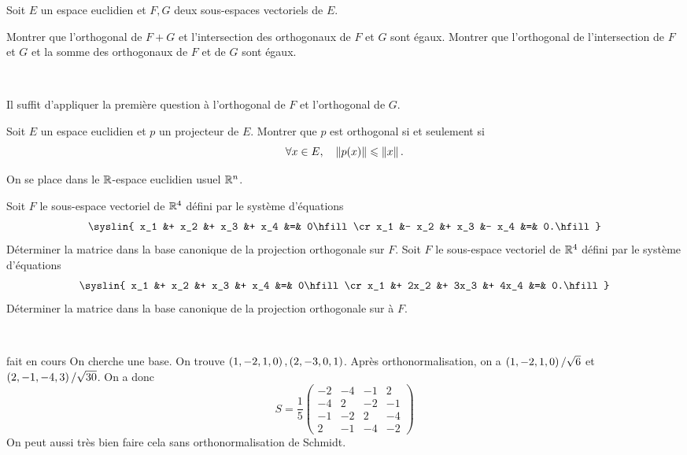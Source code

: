 \documentclass{magnolia}
\begin{document}

Soit $E$ un espace euclidien et $F,G$ deux sous-espaces vectoriels de $E$.
\begin{questions}
\question Montrer que l'orthogonal de $F+G$ et l'intersection des orthogonaux
  de $F$ et $G$ sont égaux.
\question Montrer que l'orthogonal de l'intersection de $F$ et $G$ et la somme des
  orthogonaux de $F$ et de $G$ sont égaux.
\end{questions}
\begin{sol}
$\quad$
\begin{questions}
\question
\question Il suffit d'appliquer la première question à l'orthogonal de $F$ et
  l'orthogonal de $G$.
\end{questions}
\end{sol}



Soit $E$ un espace euclidien et $p$ un projecteur de $E$. Montrer que $p$ est orthogonal si et seulement si
\[\forall x\in E ,\quad \left\|p(x)\right\|\leqslant\left\|x\right\|.\]


On se place dans le $\mathbb{R}$-espace euclidien usuel $\mathbb{R}^n$.
\begin{questions}
\question Soit $F$ le
  sous-espace vectoriel de $\mathbb{R}^4$ défini par le système d'équations
  $$\syslin{
  x_1 &+ x_2 &+ x_3 &+ x_4 &=& 0\hfill\cr
  x_1 &- x_2 &+ x_3 &- x_4 &=& 0.\hfill}
  $$
  Déterminer la matrice dans la base canonique de la projection
  orthogonale sur $F$.
\question Soit $F$ le
  sous-espace vectoriel de $\mathbb{R}^4$ défini par le système d'équations
  $$
  \syslin{
  x_1 &+ x_2  &+ x_3  &+ x_4  &=& 0\hfill\cr
  x_1 &+ 2x_2 &+ 3x_3 &+ 4x_4 &=& 0.\hfill}
  $$
  Déterminer la matrice dans la base canonique de la projection
  orthogonale sur à $F$.
\end{questions}
\begin{sol}
$\quad$
\begin{questions}
\question fait en cours
\question On cherche une base. On trouve $\left(1,-2,1,0\right),\left(2,-3,0,1\right)$.
  Après orthonormalisation, on a $\left(1,-2,1,0\right)/\sqrt{6}$ et
  $\left(2,-1,-4,3\right)/\sqrt{30}$. On a donc
  \[S=\frac{1}{5}\begin{pmatrix}
      -2 & -4 & -1 & 2\\
      -4 & 2 & -2 & -1\\
      -1 & -2 & 2 & -4\\
      2 & -1 & -4 & -2
      \end{pmatrix}\]
  On peut aussi très bien faire cela sans orthonormalisation de Schmidt.
\end{questions}
\end{sol}
\end{document}
